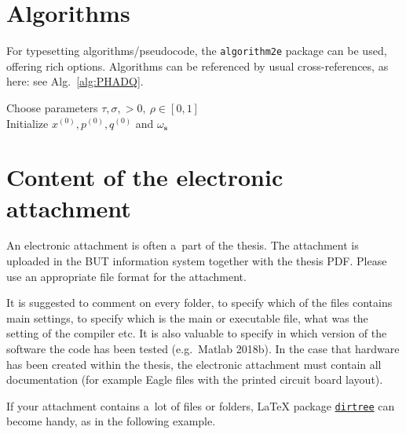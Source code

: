 \chapter{Algorithms}

For typesetting algorithms/pseudocode, the \texttt{algorithm2e} package can be used, offering rich options.
Algorithms can be referenced by usual cross-references, as here: see Alg.~\ref{alg:PHADQ}.

\begin{algorithm}%
	\DontPrintSemicolon
	\caption{B-PHADQ}
	\label{alg:PHADQ}
	Choose parameters
	$\tau, \sigma, > 0, \ \rho \in [0, 1]$\\ 
	Initialize $x^{(0)}, p^{(0)}, q^{(0)}$ and $\omega_\mathbf{s}$
	\\
\end{algorithm}



\chapter{Content of the electronic attachment}
An electronic attachment is often a~part of the thesis.
The attachment is uploaded in the BUT information system together with the thesis PDF.
Please use an appropriate file format for the attachment.

It is suggested to comment on every folder, to specify which of the files contains main settings,
to specify which is the main or executable file, what was the setting of the compiler etc.
It is also valuable to specify in which version of the software the code has been tested (e.g.\ Matlab 2018b).
In the case that hardware has been created within the thesis, the electronic attachment must contain all documentation
(for example Eagle files with the printed circuit board layout).

If your attachment contains a~lot of files or folders,
\LaTeX{} package \href{https://www.ctan.org/pkg/dirtree}{\texttt{dirtree}} can become handy,
as in the following example.

\bigskip

